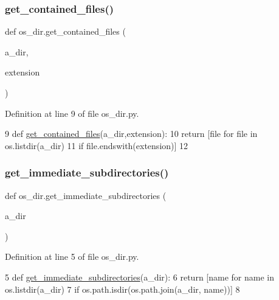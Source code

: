 \subsubsection{\texorpdfstring{get\+\_\+contained\+\_\+files()}{get\_contained\_files()}}
{\footnotesize\ttfamily def os\+\_\+dir.\+get\+\_\+contained\+\_\+files (\begin{DoxyParamCaption}\item[{}]{a\+\_\+dir,  }\item[{}]{extension }\end{DoxyParamCaption})}



Definition at line 9 of file os\+\_\+dir.\+py.


\begin{DoxyCode}
9 \textcolor{keyword}{def }\mbox{\hyperlink{namespaceos__dir_adfd8c337f0778c2c6fe21892478f5357}{get\_contained\_files}}(a\_dir,extension):
10     \textcolor{keywordflow}{return} [file \textcolor{keywordflow}{for} file \textcolor{keywordflow}{in} os.listdir(a\_dir)
11             \textcolor{keywordflow}{if} file.endswith(extension)]
12 
\end{DoxyCode}
\mbox{\label{namespaceos__dir_a7734a1131db0cd10af8ee0a4d9c5241d}} 
\subsubsection{\texorpdfstring{get\+\_\+immediate\+\_\+subdirectories()}{get\_immediate\_subdirectories()}}
{\footnotesize\ttfamily def os\+\_\+dir.\+get\+\_\+immediate\+\_\+subdirectories (\begin{DoxyParamCaption}\item[{}]{a\+\_\+dir }\end{DoxyParamCaption})}



Definition at line 5 of file os\+\_\+dir.\+py.


\begin{DoxyCode}
5 \textcolor{keyword}{def }\mbox{\hyperlink{namespaceos__dir_a7734a1131db0cd10af8ee0a4d9c5241d}{get\_immediate\_subdirectories}}(a\_dir):
6     \textcolor{keywordflow}{return} [name \textcolor{keywordflow}{for} name \textcolor{keywordflow}{in} os.listdir(a\_dir)
7             \textcolor{keywordflow}{if} os.path.isdir(os.path.join(a\_dir, name))]
8     
\end{DoxyCode}
\mbox{\label{namespaceos__dir_ad1414a4868a8da9c6cd962203048d22c}} 
